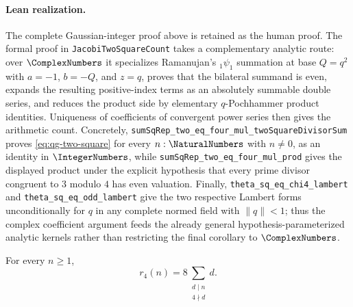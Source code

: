 \paragraph{Lean realization.}
The complete Gaussian-integer proof above is retained as the human proof.  The
formal proof in \texttt{JacobiTwoSquareCount} takes a complementary analytic
route: over $\ComplexNumbers$ it specializes Ramanujan's ${}_1\psi_1$
summation at base $Q=q^2$ with $a=-1$, $b=-Q$, and $z=q$, proves that the
bilateral summand is even, expands the resulting positive-index terms as an
absolutely summable double series, and reduces the product side by elementary
$q$-Pochhammer product identities.  Uniqueness of coefficients of convergent
power series then gives the arithmetic count.  Concretely,
\texttt{sumSqRep\_two\_eq\_four\_mul\_twoSquareDivisorSum} proves
\eqref{eq:qg-two-square} for every $n:\NaturalNumbers$ with $n\ne0$, as an
identity in $\IntegerNumbers$, while
\texttt{sumSqRep\_two\_eq\_four\_mul\_prod} gives the displayed product under
the explicit hypothesis that every prime divisor congruent to $3$ modulo $4$
has even valuation.  Finally,
\texttt{theta\_sq\_eq\_chi4\_lambert} and
\texttt{theta\_sq\_eq\_odd\_lambert} give the two respective Lambert forms
unconditionally for $q$ in any complete normed field with $\lVert q\rVert<1$;
thus the complex coefficient argument feeds the already general
hypothesis-parameterized analytic kernels rather than restricting the final
corollary to $\ComplexNumbers$.

\begin{theorem}
\label{qg:thm-four-square}
For every $n\ge1$,
\begin{equation}
 r_4(n)=8\sum_{\substack{d\mid n\\4\nmid d}}d.
\label{eq:qg-four-square}
\end{equation}
\end{theorem}

